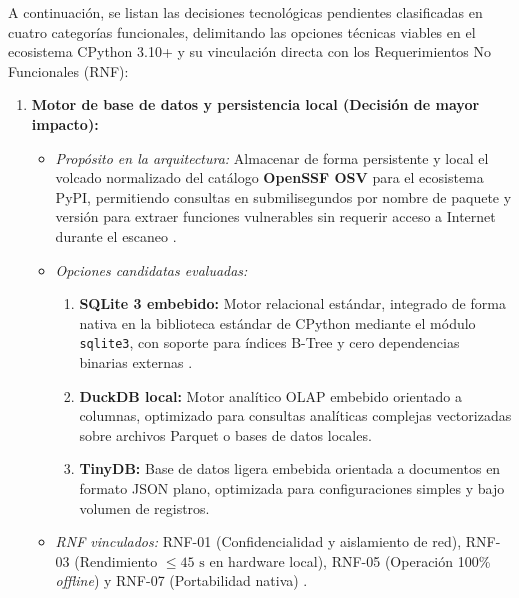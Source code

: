 A continuación, se listan las decisiones tecnológicas pendientes clasificadas en cuatro categorías funcionales, delimitando las opciones técnicas viables en el ecosistema CPython 3.10+ y su vinculación directa con los Requerimientos No Funcionales (RNF):

\begin{enumerate}
    \item \textbf{Motor de base de datos y persistencia local (Decisión de mayor impacto):}
    \begin{itemize}
        \item \textit{Propósito en la arquitectura:} Almacenar de forma persistente y local el volcado normalizado del catálogo \textbf{OpenSSF OSV} para el ecosistema PyPI, permitiendo consultas en submilisegundos por nombre de paquete y versión para extraer funciones vulnerables sin requerir acceso a Internet durante el escaneo \cite{openssf2023osv}.
        \item \textit{Opciones candidatas evaluadas:} 
        \begin{enumerate}[label=\alph*)]
            \item \textbf{SQLite 3 embebido:} Motor relacional estándar, integrado de forma nativa en la biblioteca estándar de CPython mediante el módulo \texttt{sqlite3}, con soporte para índices B-Tree y cero dependencias binarias externas \cite{pressman2020software}.
            \item \textbf{DuckDB local:} Motor analítico OLAP embebido orientado a columnas, optimizado para consultas analíticas complejas vectorizadas sobre archivos Parquet o bases de datos locales.
            \item \textbf{TinyDB:} Base de datos ligera embebida orientada a documentos en formato JSON plano, optimizada para configuraciones simples y bajo volumen de registros.
        \end{enumerate}
        \item \textit{RNF vinculados:} RNF-01 (Confidencialidad y aislamiento de red), RNF-03 (Rendimiento $\le 45\text{ s}$ en hardware local), RNF-05 (Operación 100\% \textit{offline}) y RNF-07 (Portabilidad nativa) \cite{torres2026proyecto}.
    \end{itemize}


\end{enumerate}
